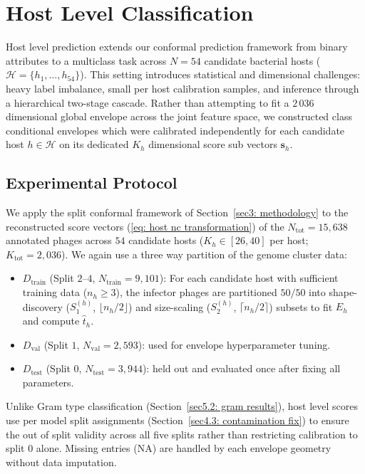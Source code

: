 \section{Host Level Classification}
\label{sec5.3: host results}
Host level prediction extends our conformal prediction framework from binary attributes to a multiclass task across 
$N = 54$ candidate bacterial hosts ($\mathcal{H} = \{h_1, \ldots, h_{54}\}$). This setting introduces statistical and dimensional 
challenges: heavy label imbalance, small per host calibration samples, and inference through a hierarchical two-stage cascade. 
Rather than attempting to fit a $2\,036$ dimensional global envelope across the joint feature space, we constructed class 
conditional envelopes which were calibrated independently for each candidate host $h \in \mathcal{H}$ on its dedicated $K_h$ 
dimensional score sub vectors $\mathbf{s}_h$.

\subsection{Experimental Protocol}
\label{sec5.3.1: host formulation}
We apply the split conformal framework of Section~\ref{sec3: methodology} to the reconstructed score vectors (\ref{eq: 
host nc transformation}) of the $N_{\text{tot}} = 15{,}638$ annotated phages across $54$ candidate hosts ($K_h \in [26, 40]$ per 
host; $K_{\text{tot}} = 2{,}036$). 
We again use a three way partition of the genome cluster data:
\begin{itemize}
    \item $D_{\text{train}}$ (Split $2$--$4$, $N_{\text{train}} = 9{,}101$): For each candidate host with sufficient training 
          data ($n_h \ge 3$), the infector phages are partitioned $50/50$ into shape-discovery ($S_1^{(h)}$, $\lfloor 
          n_h/2 \rfloor$) and size-scaling ($S_2^{(h)}$, $\lceil n_h/2 \rceil$) subsets to fit $E_h$ and compute $\hat{t}_h$.
    \item $D_{\text{val}}$ (Split $1$, $N_{\text{val}} = 2{,}593$): used for envelope hyperparameter tuning.
    \item $D_{\text{test}}$ (Split $0$, $N_{\text{test}} = 3{,}944$): held out and evaluated once after fixing all 
          parameters.
\end{itemize}
Unlike Gram type classification (Section~\ref{sec5.2: gram results}), host level scores use per model split 
assignments (Section~\ref{sec4.3: contamination fix}) to ensure the out of split validity across all five splits rather than 
restricting calibration to split $0$ alone. Missing entries ($\text{NA}$) are handled by each envelope geometry without data 
imputation.


